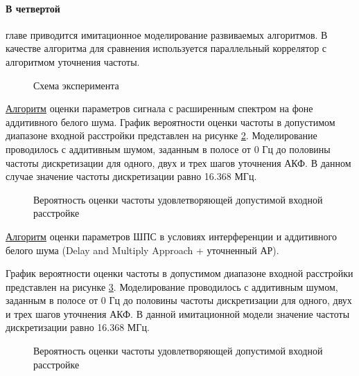 \paragraph{В четвертой} главе приводится имитационное моделирование развиваемых алгоритмов. В качестве алгоритма
для сравнения используется параллельный коррелятор с алгоритмом уточнения частоты.

\begin{figure}[H]
\center{}
	\caption{Схема эксперимента}
	\label{pic:ar_dma_probability}
\end{figure}

\underline{Алгоритм} оценки параметров сигнала с расширенным спектром на фоне аддитивного белого шума.
График вероятности оценки частоты в допустимом диапазоне входной расстройки представлен на рисунке
\ref{pic:lpc_for_1_probability}. Моделирование проводилось с аддитивным шумом, заданным в полосе от 0 Гц до
половины частоты дискретизации для одного, двух и трех шагов уточнения АКФ. В данном случае значение частоты дискретизации равно 16.368 МГц.
\begin{figure}[H]
\center{}
	\caption{Вероятность оценки частоты удовлетворяющей допустимой входной расстройке}
	\label{pic:lpc_for_1_probability}
\end{figure}

\underline{Алгоритм} оценки параметров ШПС в условиях интерференции и аддитивного белого шума
(Delay and Multiply Approach + уточненный АР).

График вероятности оценки частоты в допустимом диапазоне входной расстройки представлен на рисунке
\ref{pic:ar_dma_probability}. Моделирование проводилось с аддитивным шумом, заданным в полосе от 0 Гц до
половины частоты дискретизации для одного, двух и трех шагов уточнения АКФ. В данной имитационной модели значение частоты дискретизации равно 16.368 МГц.
\begin{figure}[H]
\center{}
	\caption{Вероятность оценки частоты удовлетворяющей допустимой входной расстройке}
	\label{pic:ar_dma_probability}
\end{figure}


